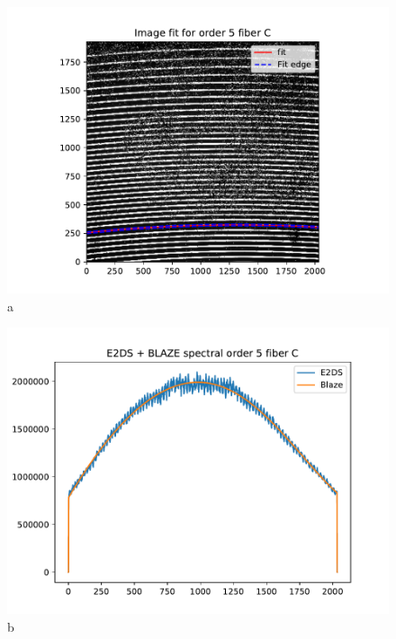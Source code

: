 \begin{figure}

\begin{center}
\begin{minipage}{.495\textwidth}
\begin{center}
\includegraphics[width=\textwidth]{Figures/cal_FF_raw_spirou_1.pdf}
a
\end{center}
\end{minipage}%
\begin{minipage}{.495\textwidth}
\begin{center}
\includegraphics[width=\textwidth]{Figures/cal_FF_raw_spirou_2.pdf}
b
\end{center}
\end{minipage}%
\end{center}


\end{figure}
